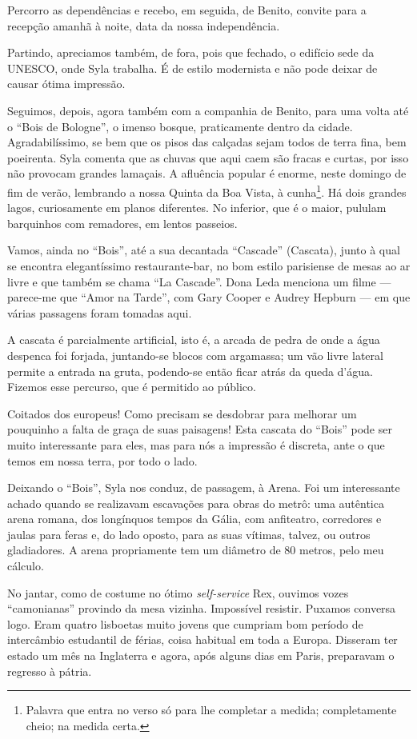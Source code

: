 Percorro as dependências e recebo, em seguida, de Benito, convite para a recepção amanhã à noite, data da nossa independência.

Partindo, apreciamos também, de fora, pois que fechado, o edifício sede da UNESCO, onde Syla trabalha. É de estilo modernista e não pode deixar de causar ótima impressão.

Seguimos, depois, agora também com a companhia de Benito, para uma volta até o ``Bois de Bologne'', o imenso bosque, praticamente dentro da cidade. Agradabilíssimo, se bem que os pisos das calçadas sejam todos de terra fina, bem poeirenta. Syla comenta que as chuvas que aqui caem são fracas e curtas, por isso não provocam grandes lamaçais. A afluência popular é enorme, neste domingo de fim de verão, lembrando a nossa Quinta da Boa Vista, à cunha\footnote{Palavra que entra no verso só para lhe completar a medida; completamente cheio; na medida certa.}. Há dois grandes lagos, curiosamente em planos diferentes. No inferior, que é o maior, pululam barquinhos com remadores, em lentos passeios.

Vamos, ainda no ``Bois'', até a sua decantada ``Cascade'' (Cascata), junto à qual se encontra elegantíssimo restaurante-bar, no bom estilo parisiense de mesas ao ar livre e que também se chama ``La Cascade''. Dona Leda menciona um filme --- parece-me que ``Amor na Tarde'', com Gary Cooper e Audrey Hepburn --- em que várias passagens foram tomadas aqui.

A cascata é parcialmente artificial, isto é, a arcada de pedra de onde a água despenca foi forjada, juntando-se blocos com argamassa; um vão livre lateral permite a entrada na gruta, podendo-se então ficar atrás da queda d’água. Fizemos esse percurso, que é permitido ao público.

Coitados dos europeus! Como precisam se desdobrar para melhorar um pouquinho a falta de graça de suas paisagens! Esta cascata do ``Bois'' pode ser muito interessante para eles, mas para nós a impressão é discreta, ante o que temos em nossa terra, por todo o lado.

Deixando o ``Bois'', Syla nos conduz, de passagem, à Arena. Foi um interessante achado quando se realizavam escavações para obras do metrô: uma autêntica arena romana, dos longínquos tempos da Gália, com anfiteatro, corredores e jaulas para feras e, do lado oposto, para as suas vítimas, talvez, ou outros gladiadores. A arena propriamente tem um diâmetro de 80 metros, pelo meu cálculo.

No jantar, como de costume no ótimo \textit{self-service} Rex, ouvimos vozes ``camonianas'' provindo da mesa vizinha. Impossível resistir. Puxamos conversa logo. Eram quatro lisboetas muito jovens que cumpriam bom período de intercâmbio estudantil de férias, coisa habitual em toda a Europa. Disseram ter estado um mês na Inglaterra e agora, após alguns dias em Paris, preparavam o regresso à pátria.

